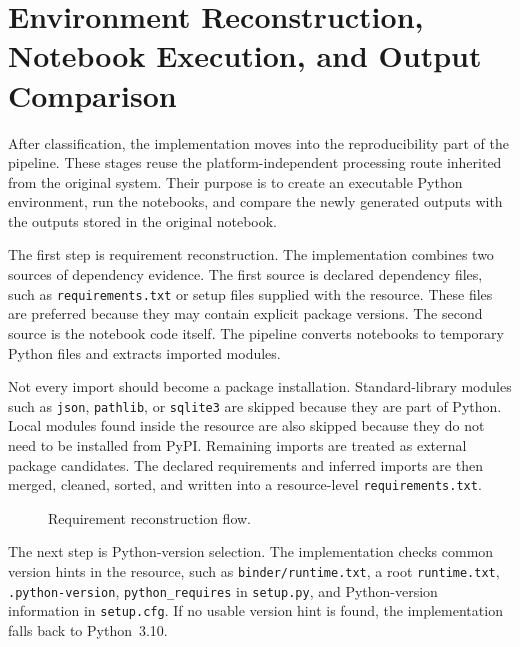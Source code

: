 \section{Environment Reconstruction, Notebook Execution, and Output Comparison}
\label{sec:environment-execution}

After classification, the implementation moves into the reproducibility part of the pipeline. These stages reuse the platform-independent processing route inherited from the original system. Their purpose is to create an executable Python environment, run the notebooks, and compare the newly generated outputs with the outputs stored in the original notebook.

The first step is requirement reconstruction. The implementation combines two sources of dependency evidence. The first source is declared dependency files, such as \texttt{requirements.txt} or setup files supplied with the resource. These files are preferred because they may contain explicit package versions. The second source is the notebook code itself. The pipeline converts notebooks to temporary Python files and extracts imported modules.

Not every import should become a package installation. Standard-library modules such as \texttt{json}, \texttt{pathlib}, or \texttt{sqlite3} are skipped because they are part of Python. Local modules found inside the resource are also skipped because they do not need to be installed from PyPI. Remaining imports are treated as external package candidates. The declared requirements and inferred imports are then merged, cleaned, sorted, and written into a resource-level \texttt{requirements.txt}.

\begin{figure}[ht]
\centering
{}
\caption{Requirement reconstruction flow.}
\label{fig:requirement-reconstruction-flow}
\end{figure}

The next step is Python-version selection. The implementation checks common version hints in the resource, such as \texttt{binder/runtime.txt}, a root \texttt{runtime.txt}, \texttt{.python-version}, \texttt{python\_requires} in \texttt{setup.py}, and Python-version information in \texttt{setup.cfg}. If no usable version hint is found, the implementation falls back to Python~3.10.

